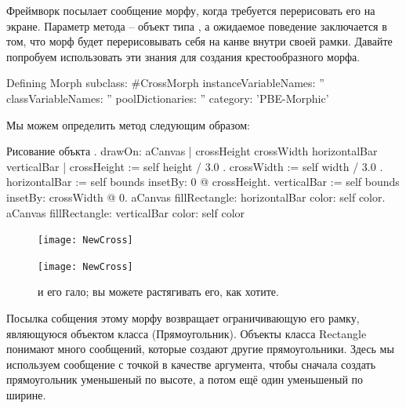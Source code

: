 \documentclass[a4paper,10pt,twoside]{book}
\begin{document}
Фреймворк посылает сообщение  морфу, когда требуется перерисовать его на экране. Параметр метода  -- объект типа , а ожидаемое поведение заключается в том, что морф будет перерисовывать себя на канве внутри своей рамки.
Давайте попробуем использовать эти знания для создания крестообразного морфа.

\begin{classdef}{Defining }
Morph subclass: #CrossMorph
	instanceVariableNames: ''
	classVariableNames: ''
	poolDictionaries: ''
	category: 'PBE-Morphic'
\end{classdef}

Мы можем определить метод  следующим образом:
\begin{method}[firstDrawOn]{Рисование объкта .}
drawOn: aCanvas 
	| crossHeight crossWidth horizontalBar verticalBar |
	crossHeight := self height / 3.0 .
	crossWidth := self width / 3.0 .
	horizontalBar := self bounds insetBy: 0 @ crossHeight.
	verticalBar := self bounds insetBy: crossWidth @ 0.
	aCanvas fillRectangle: horizontalBar color: self color.
	aCanvas fillRectangle: verticalBar color: self color
\end{method}


\begin{figure}[hbt]
	\ifluluelse
		{\centerline{\texttt{[image: NewCross]}}}
		{\centerline{\texttt{[image: NewCross]}}}
	\caption{ и его гало; вы можете растягивать его, как хотите.
		}
\end{figure}


Посылка собщения  этому морфу возвращает ограничивающую его рамку, являющуюся объектом класса  (Прямоугольник). Объекты класса Rectangle понимают много сообщений, которые создают другие прямоугольники. Здесь мы используем сообщение  с точкой в качестве аргумента, чтобы сначала создать прямоугольник уменьшеный по высоте, а потом ещё один уменьшеный по ширине.
\end{document}
